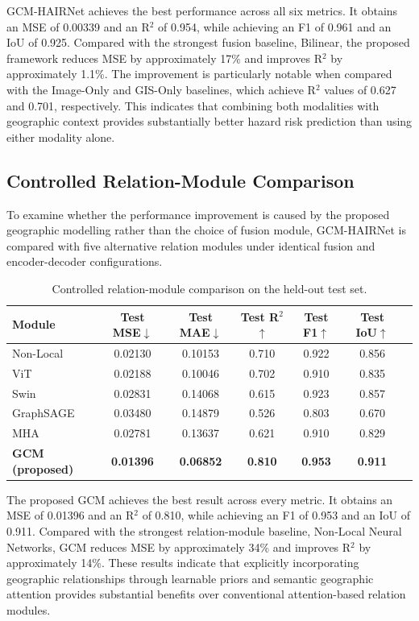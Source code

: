 \documentclass[sigconf, review=true]{acmart}
\begin{document}
GCM-HAIRNet achieves the best performance across all six metrics. It obtains an MSE of 0.00339 and an R$^2$ of 0.954, while achieving an F1 of 0.961 and an IoU of 0.925. Compared with the strongest fusion baseline, Bilinear, the proposed framework reduces MSE by approximately 17\% and improves R$^2$ by approximately 1.1\%. The improvement is particularly notable when compared with the Image-Only and GIS-Only baselines, which achieve R$^2$ values of 0.627 and 0.701, respectively. This indicates that combining both modalities with geographic context provides substantially better hazard risk prediction than using either modality alone.

\subsection{Controlled Relation-Module Comparison}

To examine whether the performance improvement is caused by the proposed geographic modelling rather than the choice of fusion module, GCM-HAIRNet is compared with five alternative relation modules under identical fusion and encoder-decoder configurations.

\begin{table}[t]
  \caption{Controlled relation-module comparison on the held-out test set.}
  \label{tab:relation}
  \begin{tabular}{lcccccc}
    \toprule
    \textbf{Module} & \textbf{Test MSE}$\downarrow$ & \textbf{Test MAE}$\downarrow$ & \textbf{Test R$^2$}$\uparrow$ & \textbf{Test F1}$\uparrow$ & \textbf{Test IoU}$\uparrow$ \\
    \midrule
    Non-Local & 0.02130 & 0.10153 & 0.710 & 0.922 & 0.856 \\
    ViT       & 0.02188 & 0.10046 & 0.702 & 0.910 & 0.835 \\
    Swin      & 0.02831 & 0.14068 & 0.615 & 0.923 & 0.857 \\
    GraphSAGE & 0.03480 & 0.14879 & 0.526 & 0.803 & 0.670 \\
    MHA       & 0.02781 & 0.13637 & 0.621 & 0.910 & 0.829 \\
    \textbf{GCM (proposed)} & \textbf{0.01396} & \textbf{0.06852} & \textbf{0.810} & \textbf{0.953} & \textbf{0.911} \\
    \bottomrule
  \end{tabular}
\end{table}

The proposed GCM achieves the best result across every metric. It obtains an MSE of 0.01396 and an R$^2$ of 0.810, while achieving an F1 of 0.953 and an IoU of 0.911. Compared with the strongest relation-module baseline, Non-Local Neural Networks, GCM reduces MSE by approximately 34\% and improves R$^2$ by approximately 14\%. These results indicate that explicitly incorporating geographic relationships through learnable priors and semantic geographic attention provides substantial benefits over conventional attention-based relation modules.
\end{document}

